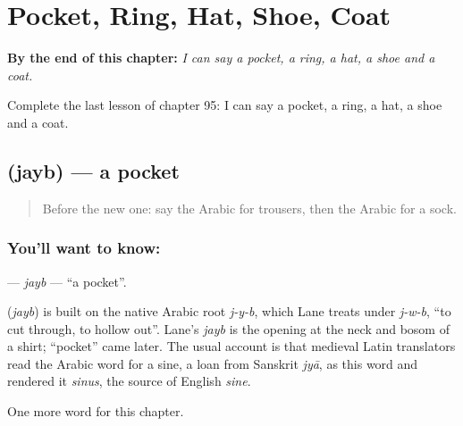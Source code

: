 
\chapter{Pocket, Ring, Hat, Shoe, Coat}
\label{ch:ar-pocket-ring-hat-shoe-coat}

\begin{chapteropening}
\textbf{By the end of this chapter:} \emph{I can say a pocket, a ring, a hat, a shoe and a coat.}

Complete the last lesson of chapter 95: I can say a pocket, a ring, a hat, a shoe and a coat.
\end{chapteropening}

\section[\texorpdfstring{\ar{جيب} (jayb)}{جيب (jayb)}]{ (jayb) — a pocket}

\label{lesson:AR-C95-jayb}



\begin{quote}
Before the new one: say the Arabic for trousers, then the Arabic for a sock.
\end{quote}

\subsection*{You'll want to know: }
\textbf{} — \emph{jayb} — \textquotedblleft{}a pocket\textquotedblright{}.

\begin{cousinweb}
\textbf{} (\emph{jayb}) is built on the native Arabic root \emph{j-y-b}, which Lane treats under \emph{j-w-b}, \textquotedblleft{}to cut through, to hollow out\textquotedblright{}. Lane's \emph{jayb} is the opening at the neck and bosom of a shirt; \textquotedblleft{}pocket\textquotedblright{} came later. The usual account is that medieval Latin translators read the Arabic word for a sine, a loan from Sanskrit \emph{jyā}, as this word and rendered it \emph{sinus}, the source of English \emph{sine}.
\end{cousinweb}

\begin{grammarlens}[title={What you've built}]
One more word for this chapter.
\end{grammarlens}

